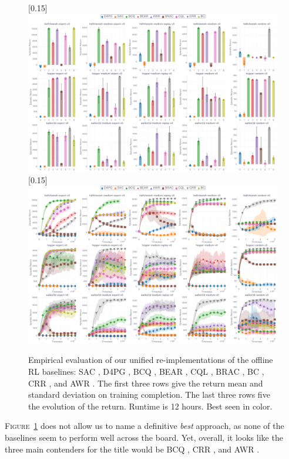 \begin{figure}
  \center\scalebox{0.15}[0.15]{\includegraphics{Plots/baselines/plots_main_eval_env_ret_barplot.pdf}}
  \center\scalebox{0.15}[0.15]{\includegraphics{Plots/baselines/plots_main_eval_env_ret_plot.pdf}}
  \caption{Empirical evaluation of our unified re-implementations of the offline RL baselines:
  SAC \cite{Haarnoja2018-bm},
  D4PG \cite{Barth-Maron2018-ot},
  BCQ \cite{Fujimoto2018-mj},
  BEAR \cite{Kumar2019-rw},
  CQL \cite{Kumar2020-zb},
  BRAC \cite{Wu2019-nl},
  BC \cite{Pomerleau1989-nh, Pomerleau1990-lm, Ratliff2007-fc, Bagnell2015-ni},
  CRR \cite{Wang2020-sr}, and
  AWR \cite{Peng2019-hu}.
  The first three rows give the return mean and standard deviation on training completion.
  The last three rows five the evolution of the return.
  Runtime is 12 hours. Best seen in color.}
  \label{baselines:barplot}
\end{figure}

\textsc{Figure}~\ref{baselines:barplot} does not allow us to name a definitive \emph{best} approach,
as none of the baselines seem to perform well across the board.
Yet, overall, it looks like the three main contenders for the title would be
BCQ \cite{Fujimoto2018-mj},
CRR \cite{Wang2020-sr}, and
AWR \cite{Peng2019-hu}.


